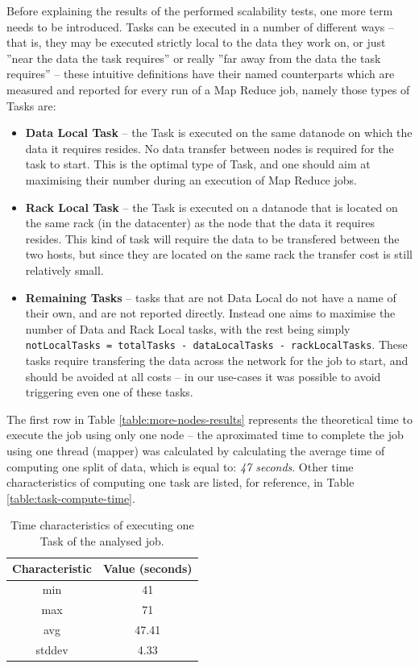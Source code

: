 Before explaining the results of the performed scalability tests, one more term needs to be introduced. Tasks can be executed in a number of different ways -- that is, they may be executed strictly local to the data they work on, or just ''near the data the task requires'' or really ''far away from the data the task requires'' -- these intuitive definitions have their named counterparts which are measured and reported for every run of a Map Reduce job, namely those types of Tasks are:

\begin{itemize}
  \item \textbf{Data Local Task} -- the Task is executed on the same datanode on which the data it requires resides. No data transfer between nodes is required for the task to start. This is the optimal type of Task, and one should aim at maximising their number during an execution of Map Reduce jobs.
  \item \textbf{Rack Local Task} -- the Task is executed on a datanode that is located on the same rack (in the datacenter) as the node that the data it requires resides. This kind of task will require the data to be transfered between the two hosts, but since they are located on the same rack the transfer cost is still relatively small.
  \item \textbf{Remaining Tasks} -- tasks that are not Data Local do not have a name of their own, and are not reported directly. Instead one aims to maximise the number of Data and Rack Local tasks, with the rest being simply \verb|notLocalTasks = totalTasks - dataLocalTasks - rackLocalTasks|. These tasks require transfering the data across the network for the job to start, and should be avoided at all costs -- in our use-cases it was possible to avoid triggering even one of these tasks.
\end{itemize}

The first row in Table \ref{table:more-nodes-results} represents the theoretical time to execute the job using only one node -- the aproximated time to complete the job using one thread (mapper) was calculated by calculating the average time of computing one split of data, which is equal to: \textit{47 seconds}. Other time characteristics of computing one task are listed, for reference, in Table \ref{table:task-compute-time}.

\begin{table}[hbt]
  \centering
  \begin{tabular}{|c|c|}
  \hline
    \textbf{Characteristic} & \textbf{Value (seconds)} \\ \hline
    min                     & 41     \\ \hline
    max                     & 71     \\ \hline
    avg                 	    & 47.41  \\ \hline
    stddev                  & 4.33   \\ \hline
  \end{tabular}
  \label{table:time-task}
  \caption{Time characteristics of executing one Task of the analysed job.}
\end{table}


